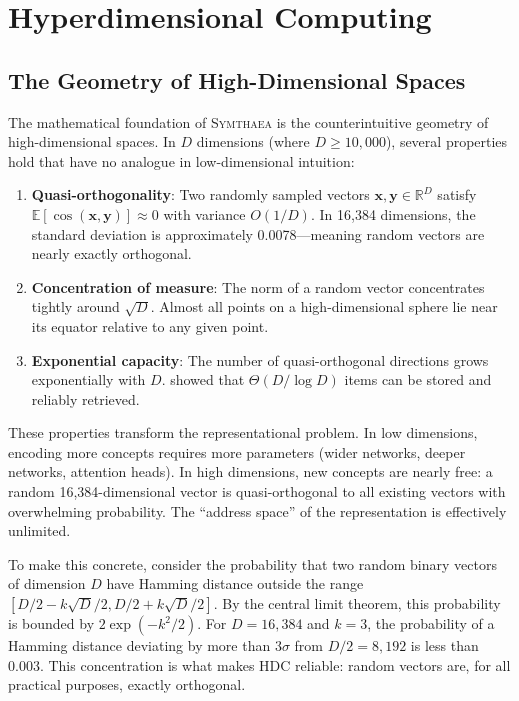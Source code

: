 \documentclass[12pt]{book}
\newcommand{\symthaea}{\textsc{Symthaea}}
\newcommand{\R}{\mathbb{R}}
\newcommand{\E}{\mathbb{E}}
\begin{document}
\chapter{Hyperdimensional Computing}
\label{ch:hdc}

\section{The Geometry of High-Dimensional Spaces}

The mathematical foundation of \symthaea{} is the counterintuitive geometry of high-dimensional spaces. In $D$ dimensions (where $D \geq 10{,}000$), several properties hold that have no analogue in low-dimensional intuition:

\begin{enumerate}
  \item \textbf{Quasi-orthogonality}: Two randomly sampled vectors $\mathbf{x}, \mathbf{y} \in \R^D$ satisfy $\E[\cos(\mathbf{x}, \mathbf{y})] \approx 0$ with variance $O(1/D)$. In 16,384 dimensions, the standard deviation is approximately 0.0078---meaning random vectors are nearly exactly orthogonal.
  \item \textbf{Concentration of measure}: The norm of a random vector concentrates tightly around $\sqrt{D}$. Almost all points on a high-dimensional sphere lie near its equator relative to any given point.
  \item \textbf{Exponential capacity}: The number of quasi-orthogonal directions grows exponentially with $D$. \citet{thomas2021theoretical} showed that $\Theta(D / \log D)$ items can be stored and reliably retrieved.
\end{enumerate}

These properties transform the representational problem. In low dimensions, encoding more concepts requires more parameters (wider networks, deeper networks, attention heads). In high dimensions, new concepts are nearly free: a random 16,384-dimensional vector is quasi-orthogonal to all existing vectors with overwhelming probability. The ``address space'' of the representation is effectively unlimited.

To make this concrete, consider the probability that two random binary vectors of dimension $D$ have Hamming distance outside the range $[D/2 - k\sqrt{D}/2, D/2 + k\sqrt{D}/2]$. By the central limit theorem, this probability is bounded by $2\exp(-k^2/2)$. For $D = 16{,}384$ and $k = 3$, the probability of a Hamming distance deviating by more than $3\sigma$ from $D/2 = 8{,}192$ is less than $0.003$. This concentration is what makes HDC reliable: random vectors are, for all practical purposes, exactly orthogonal.
\end{document}
